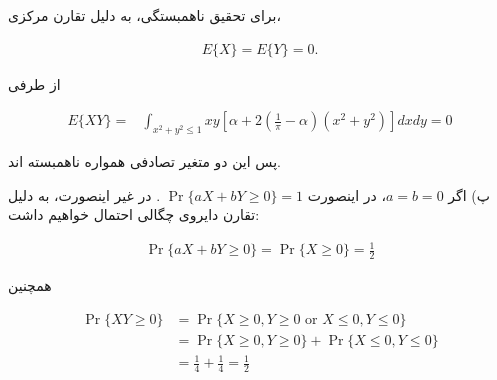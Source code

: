 \documentclass{article}
\newcommand{\eqn}[1]{
\begin{equation}\begin{split}
#1
\end{split}\end{equation}
}
\begin{document}
برای تحقیق ناهمبستگی، به دلیل تقارن مرکزی،
\eqn{
E\{X\}=E\{Y\}=0.
}
از طرفی
\eqn{
E\{XY\}=&
\int_{x^2+y^2\le 1}xy[\alpha+2(\frac{1}{\pi}-\alpha)(x^2+y^2)]dxdy
=
0
}
پس این دو متغیر تصادفی همواره ناهمبسته اند.

پ) اگر $a=b=0$، در اینصورت
$
\Pr\{aX+bY\ge 0\}=1
$
. در غیر اینصورت، به دلیل تقارن دایروی چگالی احتمال خواهیم داشت:
\eqn{
\Pr\{aX+bY\ge 0\}=\Pr\{X\ge 0\}=\frac{1}{2}
}

همچنین
\eqn{
\Pr\{XY\ge 0\}&=\Pr\{X\ge 0,Y\ge 0\text{ or }X\le 0,Y\le 0\}
\\&=
\Pr\{X\ge 0,Y\ge 0\}+\Pr\{X\le 0,Y\le 0\}
\\&=\frac{1}{4}+\frac{1}{4}=\frac{1}{2}
}
\end{document}
